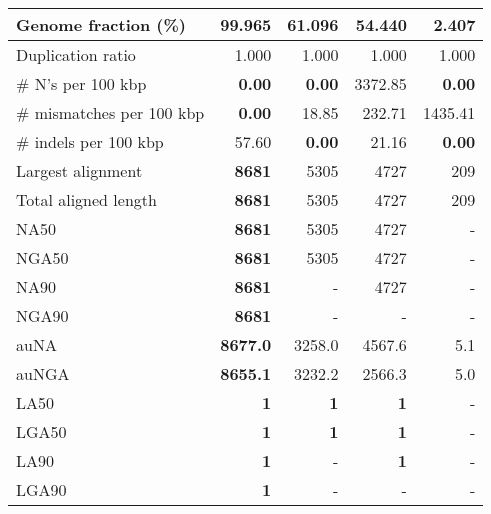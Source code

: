 \documentclass[12pt,a4paper]{article}
\begin{document}
\begin{table}[ht]
\begin{center}
\begin{tabular}{|l*{4}{|r}|}
Genome fraction (\%) & {\bf 99.965} & 61.096 & 54.440 & 2.407 \\ \hline
Duplication ratio & 1.000 & 1.000 & 1.000 & 1.000 \\ \hline
\# N's per 100 kbp & {\bf 0.00} & {\bf 0.00} & 3372.85 & {\bf 0.00} \\ \hline
\# mismatches per 100 kbp & {\bf 0.00} & 18.85 & 232.71 & 1435.41 \\ \hline
\# indels per 100 kbp & 57.60 & {\bf 0.00} & 21.16 & {\bf 0.00} \\ \hline
Largest alignment & {\bf 8681} & 5305 & 4727 & 209 \\ \hline
Total aligned length & {\bf 8681} & 5305 & 4727 & 209 \\ \hline
NA50 & {\bf 8681} & 5305 & 4727 & - \\ \hline
NGA50 & {\bf 8681} & 5305 & 4727 & - \\ \hline
NA90 & {\bf 8681} & - & 4727 & - \\ \hline
NGA90 & {\bf 8681} & - & - & - \\ \hline
auNA & {\bf 8677.0} & 3258.0 & 4567.6 & 5.1 \\ \hline
auNGA & {\bf 8655.1} & 3232.2 & 2566.3 & 5.0 \\ \hline
LA50 & {\bf 1} & {\bf 1} & {\bf 1} & - \\ \hline
LGA50 & {\bf 1} & {\bf 1} & {\bf 1} & - \\ \hline
LA90 & {\bf 1} & - & {\bf 1} & - \\ \hline
LGA90 & {\bf 1} & - & - & - \\ \hline
\end{tabular}
\end{center}
\end{table}
\end{document}

